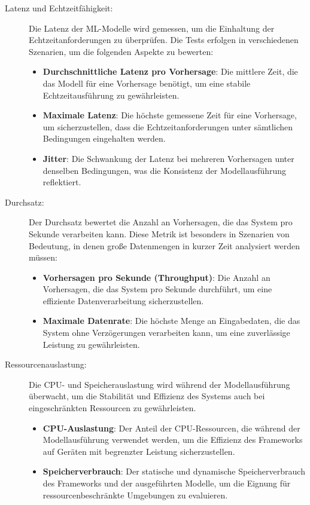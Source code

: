 \begin{description}
    \item[Latenz und Echtzeitfähigkeit:] Die Latenz der ML-Modelle wird gemessen, um die Einhaltung der Echtzeitanforderungen 
    zu überprüfen. Die Tests erfolgen in verschiedenen Szenarien, um die folgenden Aspekte zu bewerten:
    \begin{itemize}
        \item \textbf{Durchschnittliche Latenz pro Vorhersage}: Die mittlere Zeit, die das Modell für eine Vorhersage benötigt, 
        um eine stabile Echtzeitausführung zu gewährleisten.
        \item \textbf{Maximale Latenz}: Die höchste gemessene Zeit für eine Vorhersage, um sicherzustellen, dass die Echtzeitanforderungen 
        unter sämtlichen Bedingungen eingehalten werden.
        \item \textbf{Jitter}: Die Schwankung der Latenz bei mehreren Vorhersagen unter denselben Bedingungen, 
        was die Konsistenz der Modellausführung reflektiert.
    \end{itemize}

    \item[Durchsatz:] Der Durchsatz bewertet die Anzahl an Vorhersagen, die das System pro Sekunde verarbeiten kann. 
    Diese Metrik ist besonders in Szenarien von Bedeutung, in denen große Datenmengen in kurzer Zeit analysiert werden müssen:
    \begin{itemize}
        \item \textbf{Vorhersagen pro Sekunde (Throughput)}: Die Anzahl an Vorhersagen, die das System pro Sekunde durchführt, 
        um eine effiziente Datenverarbeitung sicherzustellen.
        \item \textbf{Maximale Datenrate}: Die höchste Menge an Eingabedaten, die das System ohne Verzögerungen verarbeiten kann, 
        um eine zuverlässige Leistung zu gewährleisten.
    \end{itemize}

    \item[Ressourcenauslastung:] Die CPU- und Speicherauslastung wird während der Modellausführung überwacht, um die Stabilität und 
    Effizienz des Systems auch bei eingeschränkten Ressourcen zu gewährleisten.
    \begin{itemize}
        \item \textbf{CPU-Auslastung}: Der Anteil der CPU-Ressourcen, die während der Modellausführung verwendet werden, 
        um die Effizienz des Frameworks auf Geräten mit begrenzter Leistung sicherzustellen.
        \item \textbf{Speicherverbrauch}: Der statische und dynamische Speicherverbrauch des Frameworks und der ausgeführten Modelle, 
        um die Eignung für ressourcenbeschränkte Umgebungen zu evaluieren.
    \end{itemize}
\end{description}

